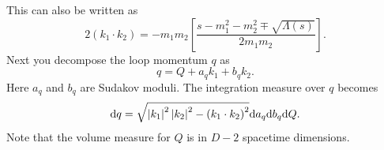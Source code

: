 This can also be written as
\begin{equation}
	2 (k_{1} \cdot k_{2}) = -m_{1} m_{2} \left[ \frac{s - m_{1}^{2} - m_{2}^{2} \mp \sqrt{\Lambda(s)}}{2 m_{1} m_{2}} \right].
\end{equation}
Next you decompose the loop momentum $q$ as
\begin{equation}
	q = Q + a_{q} k_{1} + b_{q} k_{2}.
\end{equation}
Here $a_{q}$ and $b_{q}$ are Sudakov moduli. The integration measure over $q$ becomes
\begin{equation}
	\mathrm{d}q = \sqrt{\left\lvert k_{1} \right\rvert^{2} \left\lvert k_{2} \right\rvert^{2} - \left(k_{1} \cdot k_{2}\right)^{2}} \mathrm{d}a_{q} \mathrm{d}b_{q} \mathrm{d}Q.
\end{equation}
Note that the volume measure for $Q$ is in $D-2$ spacetime dimensions.

